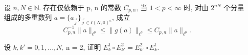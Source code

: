 \begin{theorem}\label{thm:1.14}
设 $n, N \in \mathbb{N}$. 存在仅依赖于 p, n 的常数 $C_{p,n}$, 当 $1 < p < \infty$ 时, 对由 $2^{nN}$ 个分量组成的多重数列 $a = \{a_{\vec{j}}\}_{\vec{j}\in I(N,0)^{n}}$, 成立
\[
C_{p,n}^{-1}\|a\|_{\ell^{p}} \leq \|g(a)\|_{\ell^{p}} \leq C_{p,n}\|a\|_{\ell^{p}}.
\]
\end{theorem}

\begin{exercise}\label{exer:1.27}
设 $k, k' = 0, 1, \ldots, N$, n = 2, 证明 $E_{k}^{1} \circ E_{k'}^{2} = E_{k'}^{2} \circ E_{k}^{1}$.
\end{exercise}
